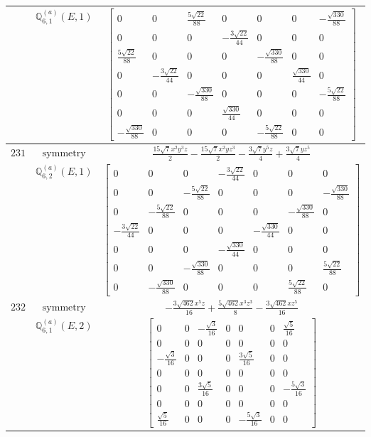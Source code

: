 \documentclass[fleqn,8pt,landscape]{jsarticle}
\begin{document}
\begin{longtable}{ccc}
$  $ & $ \mathbb{Q}_{6,1}^{(a)}(E,1) $ & $ \begin{bmatrix} 0 & 0 & \frac{5 \sqrt{22}}{88} & 0 & 0 & 0 & - \frac{\sqrt{330}}{88} \\ 0 & 0 & 0 & - \frac{3 \sqrt{22}}{44} & 0 & 0 & 0 \\ \frac{5 \sqrt{22}}{88} & 0 & 0 & 0 & - \frac{\sqrt{330}}{88} & 0 & 0 \\ 0 & - \frac{3 \sqrt{22}}{44} & 0 & 0 & 0 & \frac{\sqrt{330}}{44} & 0 \\ 0 & 0 & - \frac{\sqrt{330}}{88} & 0 & 0 & 0 & - \frac{5 \sqrt{22}}{88} \\ 0 & 0 & 0 & \frac{\sqrt{330}}{44} & 0 & 0 & 0 \\ - \frac{\sqrt{330}}{88} & 0 & 0 & 0 & - \frac{5 \sqrt{22}}{88} & 0 & 0 \end{bmatrix} $ \\ \hline
$ 231 $ & $ \text{symmetry} $ & $ \frac{15 \sqrt{7} x^{2} y^{3} z}{2} - \frac{15 \sqrt{7} x^{2} y z^{3}}{2} - \frac{3 \sqrt{7} y^{5} z}{4} + \frac{3 \sqrt{7} y z^{5}}{4} $ \\
$  $ & $ \mathbb{Q}_{6,2}^{(a)}(E,1) $ & $ \begin{bmatrix} 0 & 0 & 0 & - \frac{3 \sqrt{22}}{44} & 0 & 0 & 0 \\ 0 & 0 & - \frac{5 \sqrt{22}}{88} & 0 & 0 & 0 & - \frac{\sqrt{330}}{88} \\ 0 & - \frac{5 \sqrt{22}}{88} & 0 & 0 & 0 & - \frac{\sqrt{330}}{88} & 0 \\ - \frac{3 \sqrt{22}}{44} & 0 & 0 & 0 & - \frac{\sqrt{330}}{44} & 0 & 0 \\ 0 & 0 & 0 & - \frac{\sqrt{330}}{44} & 0 & 0 & 0 \\ 0 & 0 & - \frac{\sqrt{330}}{88} & 0 & 0 & 0 & \frac{5 \sqrt{22}}{88} \\ 0 & - \frac{\sqrt{330}}{88} & 0 & 0 & 0 & \frac{5 \sqrt{22}}{88} & 0 \end{bmatrix} $ \\ \hline
$ 232 $ & $ \text{symmetry} $ & $ - \frac{3 \sqrt{462} x^{5} z}{16} + \frac{5 \sqrt{462} x^{3} z^{3}}{8} - \frac{3 \sqrt{462} x z^{5}}{16} $ \\
$  $ & $ \mathbb{Q}_{6,1}^{(a)}(E,2) $ & $ \begin{bmatrix} 0 & 0 & - \frac{\sqrt{3}}{16} & 0 & 0 & 0 & \frac{\sqrt{5}}{16} \\ 0 & 0 & 0 & 0 & 0 & 0 & 0 \\ - \frac{\sqrt{3}}{16} & 0 & 0 & 0 & \frac{3 \sqrt{5}}{16} & 0 & 0 \\ 0 & 0 & 0 & 0 & 0 & 0 & 0 \\ 0 & 0 & \frac{3 \sqrt{5}}{16} & 0 & 0 & 0 & - \frac{5 \sqrt{3}}{16} \\ 0 & 0 & 0 & 0 & 0 & 0 & 0 \\ \frac{\sqrt{5}}{16} & 0 & 0 & 0 & - \frac{5 \sqrt{3}}{16} & 0 & 0 \end{bmatrix} $ \\ \hline

\end{longtable}
\end{document}

